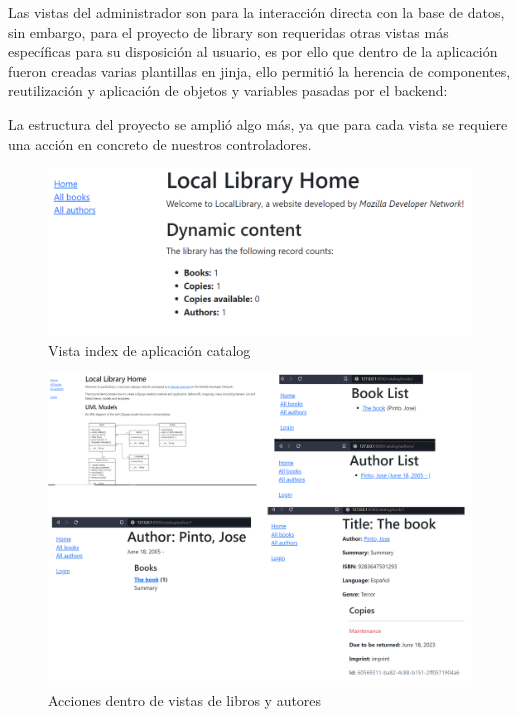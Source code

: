 \documentclass{article}
\begin{document}
    Las vistas del administrador son para la interacción directa con la base de datos, sin embargo, para el proyecto de library son requeridas otras vistas más específicas para su disposición al usuario, es por ello que dentro de la aplicación fueron creadas varias plantillas en jinja, ello permitió la herencia de componentes, reutilización y aplicación de objetos y variables pasadas por el backend:

    La estructura del proyecto se amplió algo más, ya que para cada vista se requiere una acción en concreto de nuestros controladores.

    \begin{figure}[H]
        \centering
        \includegraphics[scale=0.42]{img/img11.png}
        \caption{Vista index de aplicación catalog}
        \label{fig:imagen}
    \end{figure}

    \begin{figure}[H]
        \centering
        \includegraphics[scale=0.42]{img/img12.png}
        \caption{Acciones dentro de vistas de libros y autores}
        \label{fig:imagen}
    \end{figure}
\end{document}
